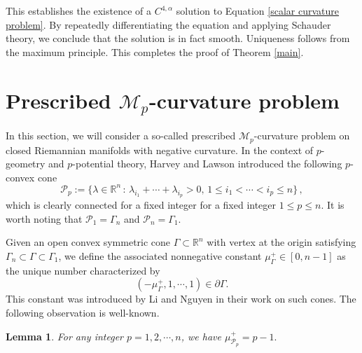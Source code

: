 \documentclass{article}
\newcommand{\R}{\mathbb{R}}
\theoremstyle{plain}
\newtheorem{lemma}[theorem]{Lemma}
\theoremstyle{definition}
\theoremstyle{definition}
\numberwithin{equation}{section}
\begin{document}
\begin{sloppypar}
This establishes the existence of a $C^{4,\alpha}$ solution to Equation \eqref{scalar curvature problem}. By repeatedly differentiating the equation and applying Schauder theory, we conclude that the solution is in fact smooth. Uniqueness follows from the maximum principle. This completes the proof of Theorem \ref{main}.



\section{Prescribed $\mathcal{M}_p$-curvature problem}
In this section, we will consider a so-called prescribed $\mathcal{M}_p$-curvature problem on closed Riemannian manifolds with negative curvature. In the context of $p$-geometry and $p$-potential theory, Harvey and Lawson  \cite{HL13} introduced the following $p$-convex cone
\[
\mathcal{P}_{p}:=\{ \lambda\in \R^n \,: \,\lambda_{i_1}+\cdots +\lambda_{i_{p}}>0,\, 1\leq i_1<\cdots< i_{p}\leq n\}\,,
\]
which is clearly connected for a fixed integer for a fixed integer $1\leq p\leq n$. It is worth noting that $\mathcal{P}_{1}=\Gamma_{n}$ and $\mathcal{P}_{n}=\Gamma_{1}$.

Given an open convex symmetric cone $\Gamma\subset\mathbb{R}^n$ with vertex at the origin satisfying $\Gamma_{n}\subset \Gamma \subset \Gamma_{1}$, we define the associated nonnegative constant $\mu_{\Gamma}^{+}\in [0,n-1]$  as the unique number characterized by
\[
 (-\mu^{+}_{\Gamma}, 1, \cdots,1)\in \partial\Gamma.
 \]
This constant was introduced by Li and Nguyen \cite{LN14b} in their work on such cones. The following observation is well-known.
\begin{lemma}  For any integer $p= 1,2, \cdots,n$, we have $\mu^{+}_{\mathcal{P}_{p}}=p-1.$  
\end{lemma}


\end{sloppypar}
\end{document}
